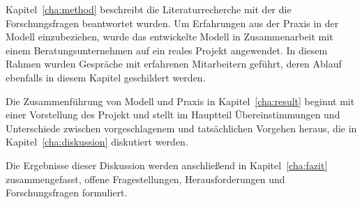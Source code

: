 Kapitel~\ref{cha:method} beschreibt die Literaturrecherche mit der die 
Forschungsfragen beantwortet wurden. Um Erfahrungen aus der Praxis in der 
Modell einzubeziehen, wurde das entwickelte Modell in Zusammenarbeit mit einem 
Beratungsunternehmen auf ein reales Projekt angewendet. In diesem Rahmen wurden 
Gespräche mit erfahrenen Mitarbeitern geführt, deren Ablauf ebenfalls in diesem 
Kapitel geschildert werden.

Die Zusammenführung von Modell und Praxis in Kapitel~\ref{cha:result} beginnt 
mit einer Vorstellung des Projekt und stellt im Hauptteil Übereinstimmungen und 
Unterschiede zwischen vorgeschlagenem und tatsächlichen Vorgehen heraus, die in 
Kapitel~\ref{cha:diskussion} diskutiert werden.

Die Ergebnisse dieser Diskussion werden anschließend in Kapitel~\ref{cha:fazit} 
zusammengefasst, offene Fragestellungen, Herausforderungen und Forschungsfragen 
formuliert.
\begin{comment}


Lösungen 
haben ganz allgemein zwei Vorteile für Unternehmen, die am für Salesforce 
typischen Beispiel einer Kundenverwaltung schildern möchte. Möchte ein 
Unternehmen Informationen zu seinen Kunden zentral speichern, muss es bei einer 
Cloudlösung keinen Server installieren und warten. Es kann also Kosten für 
Hardware sowie mindestens noch Personalkosten bei der Administration einsparen. 
Der erste Vorteil entsteht also durch Kosteneinsparungen auf Serverseite des 
Unternehmens. Cloudbasierte Software lässt sich regelmäßig mit einem Browser 
bedienen, der auf allen mobilen und internetfähigen Geräten wie auf 
herkömmlichen Computern verfügbar sein dürfte. Im Beispiel muss der Anwender, 
der Zugriff auf die Kundendaten nehmen will, keine Software installieren und 
ist an kein Gerät gebunden.\\
Die Idee hinter dem Migrationsprojekt ist die Verbindung der Expertise beider 
Unternehmen: Die Nutzung des aufgebauten Know-Hows auf einer neuen, 
zukunftsfähigen Plattform. \\
Dabei stellen sich die folgenden Fragen:
\begin{itemize}
	\item Welche Strategie sollte künftig mit dem bestehenden Produkt 
verfolgt werden?
	\item In welchem Umfang soll die Cloud Software durch 
	\begin{itemize}
		\item den Anbieter
		\item den Kunden
	\end{itemize}
	anpassbar sein?
	\item Wie lassen sich idealerweise die Anforderungen ermitteln?
	\item Welche Funktionen sollen übernommen werden?
	\item Wie lässt sich ein bestehendes Produkt an die neuen Möglichkeiten 
der Cloud anpassen?
\end{itemize}

Im folgenden gebe ich einen Überblick über Methoden des 
Requirements-Engineering.
\end{comment}
